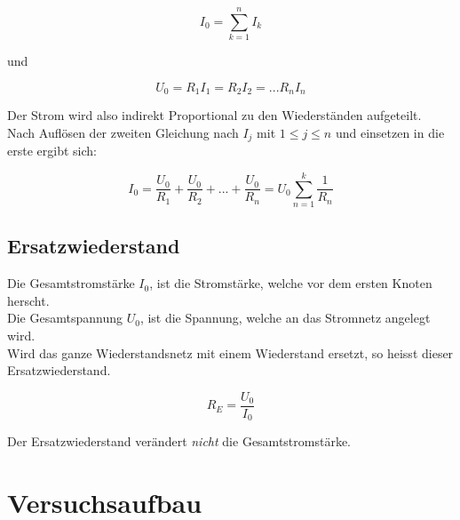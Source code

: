 \documentclass[a4paper,12pt]{article}
\begin{document}
\[ I_0 = \sum_{k=1}^{n} I_k \]

und 

\[ U_0 = R_1 I_1 = R_2 I_2 = ...R_n I_n \]

Der Strom wird also indirekt Proportional zu den Wiederständen aufgeteilt. \\
Nach Auflösen der zweiten Gleichung nach $I_j$ mit $1 \leq j \leq n$ und einsetzen in die erste
ergibt sich:

\[ I_0 = \frac{U_0}{R_1} + \frac{U_0}{R_2} + ... + \frac{U_0}{R_n} = U_0 \sum_{n=1}^k \frac{1}{R_n} \]



\subsection{Ersatzwiederstand}

Die Gesamtstromstärke $I_0$, ist die Stromstärke, welche vor dem ersten Knoten herscht. \\
Die Gesamtspannung $U_0$, ist die Spannung, welche an das Stromnetz angelegt wird. \\
Wird das ganze Wiederstandsnetz mit einem Wiederstand ersetzt, so heisst dieser Ersatzwiederstand. 

\[ R_E = \frac{U_0}{I_0} \]

Der Ersatzwiederstand verändert \textit{nicht} die Gesamtstromstärke. 

\section{Versuchsaufbau}


\end{document}
